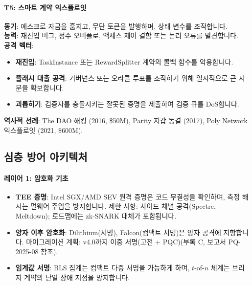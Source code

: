 \documentclass[11pt]{article}
\begin{document}
\paragraph{T5: 스마트 계약 익스플로잇}
\textbf{동기}: 에스크로 자금을 훔치고, 무단 토큰을 발행하며, 상태 변수를 조작합니다.\\
\textbf{능력}: 재진입 버그, 정수 오버플로, 액세스 제어 결함 또는 논리 오류를 발견합니다.\\
\textbf{공격 벡터}:
\begin{itemize}[noitemsep]
  \item \textbf{재진입}: TaskInstance 또는 RewardSplitter 계약의 콜백 함수를 악용합니다.
  \item \textbf{플래시 대출 공격}: 거버넌스 또는 오라클 투표를 조작하기 위해 일시적으로 큰 지분을 확보합니다.
  \item \textbf{괴롭히기}: 검증자를 충돌시키는 잘못된 증명을 제출하여 검증 큐를 DoS합니다.
\end{itemize}
\textbf{역사적 선례}: The DAO 해킹 (2016, \$50M), Parity 지갑 동결 (2017), Poly Network 익스플로잇 (2021, \$600M).

\subsection{심층 방어 아키텍처}

\paragraph{레이어 1: 암호화 기초}
\begin{itemize}[noitemsep]
  \item \textbf{TEE 증명}: Intel SGX/AMD SEV 원격 증명은 코드 무결성을 확인하며, 측정 해시는 멀웨어 주입을 방지합니다. 제한 사항: 사이드 채널 공격(Spectre, Meltdown); 로드맵에는 zk-SNARK 대체가 포함됩니다.
  \item \textbf{양자 이후 암호화}: Dilithium(서명), Falcon(컴팩트 서명)은 양자 공격에 저항합니다. 마이그레이션 계획: v4.0까지 이중 서명(고전 + PQC)(부록 C, 보고서 PQ-2025-08 참조).
  \item \textbf{임계값 서명}: BLS 집계는 컴팩트 다중 서명을 가능하게 하며, $t$-of-$n$ 체계는 브리지 계약의 단일 장애 지점을 방지합니다.
\end{itemize}
\end{document}
